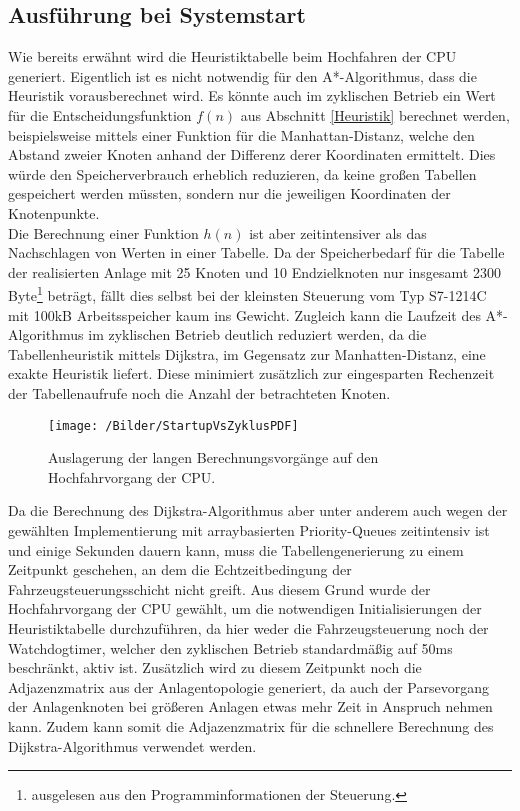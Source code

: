 	
		\subsection{Ausführung bei Systemstart}
			
			Wie bereits erwähnt wird die Heuristiktabelle beim Hochfahren der CPU generiert. Eigentlich ist es nicht notwendig für den A*-Algorithmus, dass die Heuristik vorausberechnet wird. Es könnte auch im zyklischen Betrieb ein Wert für die Entscheidungsfunktion $f(n)$ aus Abschnitt \ref{Heuristik} berechnet werden, beispielsweise mittels einer Funktion für die Manhattan-Distanz, welche den Abstand zweier Knoten anhand der Differenz derer Koordinaten ermittelt. Dies würde den Speicherverbrauch erheblich reduzieren, da keine großen Tabellen gespeichert werden müssten, sondern nur die jeweiligen Koordinaten der Knotenpunkte.
			\\[4pt]
			Die Berechnung einer Funktion $h(n)$ ist aber zeitintensiver als das Nachschlagen von Werten in einer Tabelle. Da der Speicherbedarf für die Tabelle der realisierten Anlage mit 25 Knoten und 10 Endzielknoten nur insgesamt 2300 Byte\footnote{ausgelesen aus den Programminformationen der Steuerung.} beträgt, fällt dies selbst bei der kleinsten Steuerung vom Typ S7-1214C mit 100kB Arbeitsspeicher kaum ins Gewicht. Zugleich kann die Laufzeit des A*-Algorithmus im zyklischen Betrieb deutlich reduziert werden, da die Tabellenheuristik mittels Dijkstra, im Gegensatz zur Manhatten-Distanz, eine exakte Heuristik liefert. Diese minimiert zusätzlich zur eingesparten Rechenzeit der Tabellenaufrufe noch die Anzahl der betrachteten Knoten.
			
			\begin{figure}
				\centering
				\texttt{[image: /Bilder/StartupVsZyklusPDF]}
				\vspace{0.2cm}
				\caption{Auslagerung der langen Berechnungsvorgänge auf den Hochfahrvorgang der CPU.}
			\end{figure}
			
			Da die Berechnung des Dijkstra-Algorithmus aber unter anderem auch wegen der gewählten Implementierung mit arraybasierten Priority-Queues zeitintensiv ist \cite{BorisCherkassky1993} und einige Sekunden dauern kann, muss die Tabellengenerierung zu einem Zeitpunkt geschehen, an dem die Echtzeitbedingung der Fahrzeugsteuerungsschicht nicht greift. Aus diesem Grund wurde der Hochfahrvorgang der CPU gewählt, um die notwendigen Initialisierungen der Heuristiktabelle durchzuführen, da hier weder die Fahrzeugsteuerung noch der Watchdogtimer, welcher den zyklischen Betrieb standardmäßig auf 50ms beschränkt, aktiv ist. Zusätzlich wird zu diesem Zeitpunkt noch die Adjazenzmatrix aus der Anlagentopologie generiert, da auch der Parsevorgang der Anlagenknoten bei größeren Anlagen etwas mehr Zeit in Anspruch nehmen kann. Zudem kann somit die Adjazenzmatrix für die schnellere Berechnung des Dijkstra-Algorithmus verwendet werden.
				
